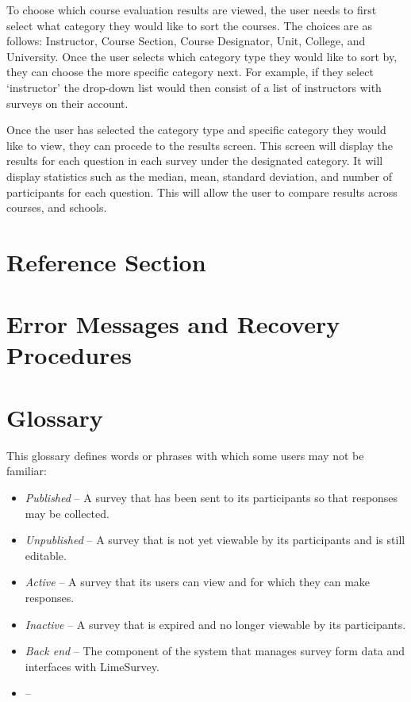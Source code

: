 \documentclass{article}
\begin{document}
To choose which course evaluation results are viewed, the user needs to first select what category they would like to sort the courses. The choices are as follows: Instructor, Course Section, Course Designator, Unit, College, and University. Once the user selects which category type they would like to sort by, they can choose the more specific category next. For example, if they select `instructor' the drop-down list would then consist of a list of instructors with surveys on their account. 

Once the user has selected the category type and specific category they would like to view, they can procede to the results screen. This screen will display the results for each question in each survey under the designated category. It will display statistics such as the median, mean, standard deviation, and number of participants for each question. This will allow the user to compare results across courses, and schools.

\section{Reference Section}



\appendix

\newpage
\section{Error Messages and Recovery Procedures}



\section{Glossary}

This glossary defines words or phrases with which some users may not be familiar:

\begin{itemize}
 \item \textit{Published} -- A survey that has been sent to its participants so that responses may be collected.
 \item \textit{Unpublished} -- A survey that is not yet viewable by its participants and is still editable.
 \item \textit{Active} -- A survey that its users can view and for which they can make responses.
 \item \textit{Inactive} -- A survey that is expired and no longer viewable by its participants.
 \item \textit{Back end} -- The component of the system that manages survey form data and interfaces with LimeSurvey.
 \item \textit{} -- 
\end{itemize}
\end{document}

